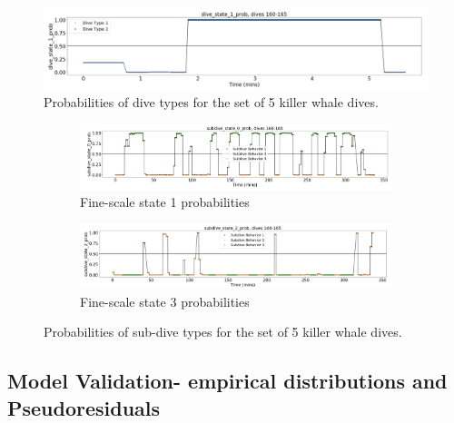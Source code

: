 \documentclass[12pt]{TD-CJS}
\begin{document}
\begin{figure}[ht]
	\centering
	\includegraphics[width=5in]{../Plots/Coarse_state_probs.png}
	\caption{Probabilities of dive types for the set of 5 killer whale dives.}
	\label{fig:coarse_probs}
\end{figure}
%
\begin{figure}[ht]
	\centering
	\begin{subfigure}[t]{1.0\textwidth}
        \centering
        \includegraphics[width=5in]{../Plots/Fine_state_probs_1.png}
        \caption{Fine-scale state 1 probabilities}
    \end{subfigure}
    \newline
    \begin{subfigure}[t]{1.0\textwidth}
        \centering
        \includegraphics[width=5in]{../Plots/Fine_state_probs_3.png}
        \caption{Fine-scale state 3 probabilities}
    \end{subfigure}
	\caption{Probabilities of sub-dive types for the set of 5 killer whale dives.}
	\label{fig:fine_probs}
\end{figure}

\subsection{Model Validation- empirical distributions and Pseudoresiduals}
\end{document}
